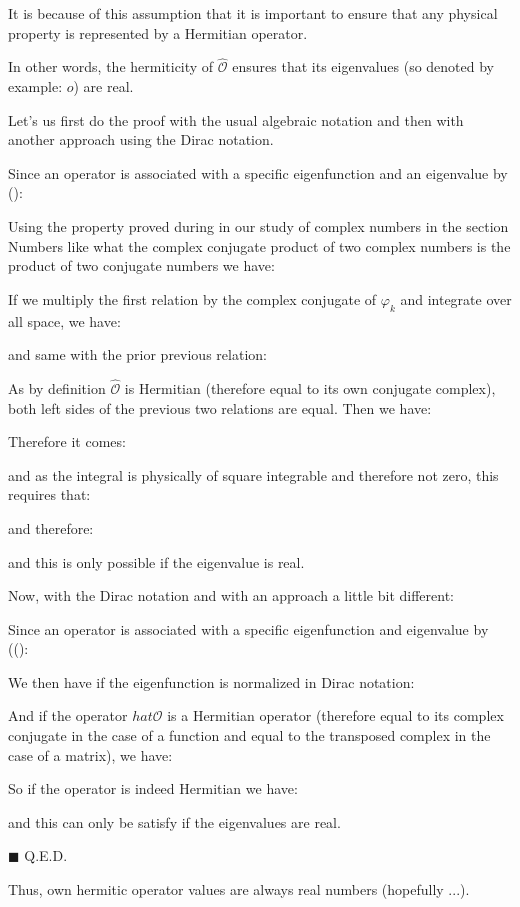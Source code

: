 	It is because of this assumption that it is important to ensure that any physical property is represented by a Hermitian operator. 
	\begin{theorem}
	In other words, the hermiticity of $\hat{\mathcal{O}}$ ensures that its eigenvalues (so denoted by example: $o$) are real.
	
	Let's us first do the proof with the usual algebraic notation and then with another approach using the Dirac notation.
	\end{theorem}
	\begin{dem}
	Since an operator is associated with a specific eigenfunction and an eigenvalue by ():
	
	Using the property proved during in our study of complex numbers in the section Numbers like what the complex conjugate product of two complex numbers is the product of two conjugate numbers we have:
		
	If we multiply the first relation by the complex conjugate of $\varphi_k$ and integrate over all space, we have:
	
	and same with the prior previous relation:
	
	As by definition $\hat{\mathcal{O}}$ is Hermitian (therefore equal to its own conjugate complex), both left sides of the previous two relations are equal. Then we have:
	
	Therefore it comes:
	
	and as the integral is physically of square integrable and therefore not zero, this requires that:
	
	and therefore:
	
	and this is only possible if the eigenvalue is real.
	
	Now, with the Dirac notation and with an approach a little bit different:
	
	Since an operator is associated with a specific eigenfunction and eigenvalue by (():
	
	We then have if the eigenfunction is normalized in Dirac notation:
	
	And if the operator $hat{\mathcal{O}}$ is a Hermitian operator (therefore equal to its complex conjugate in the case of a function and equal to the transposed complex in the case of a matrix), we have:
	
	So if the operator is indeed Hermitian we have:
	
	and this can only be satisfy if the eigenvalues are real.
	\begin{flushright}
		$\blacksquare$  Q.E.D.
	\end{flushright}
	\end{dem}
	Thus, own hermitic operator values are always real numbers (hopefully ...).
	
